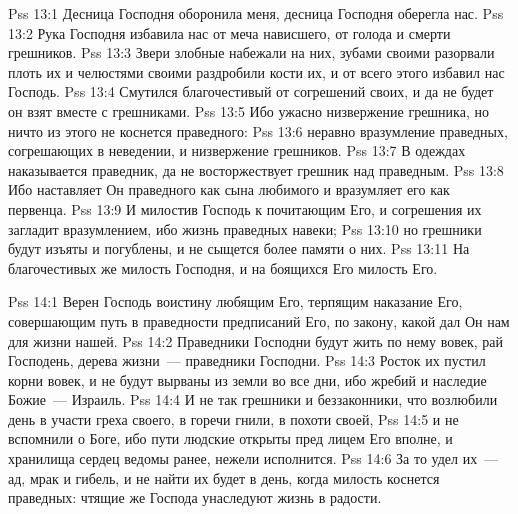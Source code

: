\vs Pss 13:1
Десница Господня оборонила меня, десница Господня оберегла
нас.
\vs Pss 13:2
Рука Господня избавила нас от меча нависшего, от голода и
смерти грешников.
\vs Pss 13:3
Звери злобные набежали на них, зубами своими разорвали плоть
их
и челюстями своими раздробили кости их, и от всего этого избавил нас
Господь.
\vs Pss 13:4
Смутился благочестивый от согрешений своих, и да не будет он
взят вместе с грешниками.
\vs Pss 13:5
Ибо ужасно низвержение грешника, но ничто из этого не коснется
праведного:
\vs Pss 13:6
неравно вразумление праведных, согрешающих в неведении, и
низвержение грешников.
\vs Pss 13:7
В одеждах наказывается праведник, да не восторжествует грешник
над праведным.
\vs Pss 13:8
Ибо наставляет Он праведного как сына любимого и вразумляет его
как первенца.
\vs Pss 13:9
И милостив Господь к почитающим Его, и согрешения их загладит
вразумлением, ибо жизнь праведных навеки;
\vs Pss 13:10
но грешники будут изъяты и погублены, и не сыщется более памяти о
них.
\vs Pss 13:11
На благочестивых же милость Господня, и на боящихся Его милость
Его.

\vs Pss 14:1
Верен Господь воистину любящим Его, терпящим наказание Его,
совершающим путь в праведности предписаний Его, по закону, какой дал Он нам для
жизни нашей.
\vs Pss 14:2
Праведники Господни будут жить по нему вовек, рай Господень,
дерева жизни~--- праведники Господни.
\vs Pss 14:3
Росток их пустил корни вовек,
и не будут вырваны из земли во все дни, ибо жребий и наследие
Божие~--- Израиль.
\vs Pss 14:4
И не так грешники и беззаконники,
что возлюбили день в участи греха своего, в горечи гнили, в похоти своей,
\vs Pss 14:5
и не вспомнили о Боге,
ибо пути людские открыты пред лицем Его вполне, и хранилища сердец ведомы
ранее, нежели исполнится.
\vs Pss 14:6
За то удел их~--- ад, мрак и гибель, и не найти их будет в
день, когда милость коснется
праведных: чтящие же Господа унаследуют жизнь в радости.

